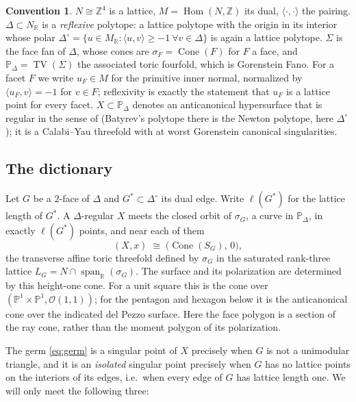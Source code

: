 \documentclass[11pt]{amsart}
\theoremstyle{definition}
\newtheorem{convention}[theorem]{Convention}
\theoremstyle{remark}
\theoremstyle{plain}
\newcommand{\ZZ}{\mathbb{Z}}
\newcommand{\RR}{\mathbb{R}}
\newcommand{\PP}{\mathbb{P}}
\newcommand{\cO}{\mathcal{O}}
\newcommand{\Cone}{\operatorname{Cone}}
\newcommand{\TV}{\operatorname{TV}}
\newcommand{\Hom}{\operatorname{Hom}}
\begin{document}
\begin{convention}\label{conv:setup}
$N \cong \ZZ^4$ is a lattice, $M = \Hom(N,\ZZ)$ its dual,
$\langle \cdot,\cdot\rangle$ the pairing.  $\Delta \subset N_\RR$ is a
\emph{reflexive} polytope: a lattice polytope with the origin in its interior
whose polar
$\Delta^\circ = \{u \in M_\RR : \langle u,v\rangle \ge -1 \ \forall v \in \Delta\}$
is again a lattice polytope.  $\Sigma$ is the face fan of $\Delta$, whose
cones are $\sigma_F = \Cone(F)$ for $F$ a face, and
$\PP_\Delta = \TV(\Sigma)$ the associated toric fourfold, which is Gorenstein
Fano.  For a facet $F$ we write $u_F \in M$ for the primitive inner normal,
normalized by $\langle u_F, v\rangle = -1$ for $v \in F$; reflexivity is exactly
the statement that $u_F$ is a lattice point for every facet.  $X \subset
\PP_\Delta$ denotes an anticanonical hypersurface that is regular in the sense
of \cite[Def.~3.1.1]{Batyrev94} (Batyrev's polytope there is the Newton
polytope, here $\Delta^\circ$); it is a Calabi--Yau threefold with at worst
Gorenstein canonical singularities.
\end{convention}

\subsection{The dictionary}
Let $G$ be a $2$-face of $\Delta$ and $G^* \subset \Delta^\circ$ its dual edge.
Write $\ell(G^*)$ for the lattice length of $G^*$.  A $\Delta$-regular $X$ meets
the closed orbit of $\sigma_G$, a curve in $\PP_\Delta$, in exactly
$\ell(G^*)$ points, and near each of them
\begin{equation}\label{eq:germ}
  (X, x) \;\cong\; \bigl(\Cone(S_G),\,0\bigr),
\end{equation}
the transverse affine toric threefold defined by $\sigma_G$ in the
saturated rank-three lattice
$L_G=N\cap\operatorname{span}_{\RR}(\sigma_G)$.
The surface and its polarization are determined by this height-one
cone.  For a unit square this is the cone over
$(\PP^1\times\PP^1,\cO(1,1))$; for the pentagon and hexagon below it is
the anticanonical cone over the indicated del Pezzo surface.
Here the face polygon is a section of the ray cone, rather than the
moment polygon of its polarization.

The germ \eqref{eq:germ} is a singular point of $X$ precisely when $G$ is not a
unimodular triangle, and it is an \emph{isolated} singular point precisely when
$G$ has no lattice points on the interiors of its edges, i.e.\ when every edge
of $G$ has lattice length one.  We will only meet the following three:
\end{document}
